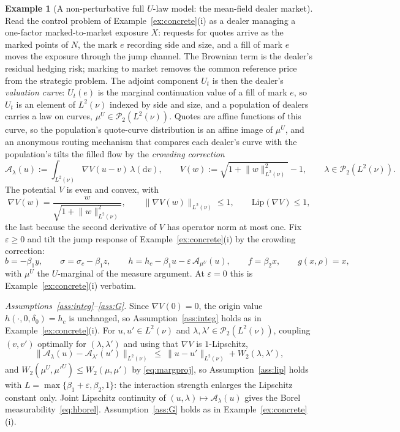 \documentclass[preprint,12pt]{elsarticle}
\newcommand{\diff}{\mathrm{d}}
\newcommand{\Lnu}{L^2(\nu)}
\newcommand{\Lnorm}[1]{\lVert #1\rVert_{\Lnu}}
\numberwithin{equation}{section}
\theoremstyle{plain}
\theoremstyle{definition}
\theoremstyle{\PaperRemarkStyle}
\newtheorem{example}[theorem]{Example}
\begin{document}
\begin{example}[A non-perturbative full $U$-law model: the mean-field dealer market]\label{ex:dealer}
Read the control problem of Example~\ref{ex:concrete}(i) as a dealer managing a one-factor
marked-to-market exposure $X$: requests for quotes arrive as the marked points of $N$, the
mark $e$ recording side and size, and a fill of mark $e$ moves the exposure through the
jump channel. The Brownian term is the dealer's residual hedging risk; marking to market
removes the common reference price from the strategic problem. The adjoint component $U_t$ is then the dealer's \emph{valuation curve}:
$U_t(e)$ is the marginal continuation value of a fill of mark $e$, so $U_t$ is an element
of $\Lnu$ indexed by side and size, and a population of dealers carries a law on curves,
$\mu^U\in\mathcal P_2(\Lnu)$. Quotes are affine functions of this curve, so the
population's quote-curve distribution is an affine image of $\mu^U$, and an anonymous
routing mechanism that compares each dealer's curve with the population's tilts the filled
flow by the \emph{crowding correction}
\[
\mathcal A_\lambda(u):=\int_{\Lnu}\nabla V(u-v)\,\lambda(\diff v),\qquad
V(w):=\sqrt{1+\Lnorm{w}^2}-1,\qquad \lambda\in\mathcal P_2(\Lnu).
\]
The potential $V$ is even and convex, with
\[
\nabla V(w)=\frac{w}{\sqrt{1+\Lnorm{w}^2}},\qquad \Lnorm{\nabla V(w)}\le1,\qquad
\mathrm{Lip}(\nabla V)\le1,
\]
the last because the second derivative of $V$ has operator norm at most one.
Fix $\varepsilon\ge0$ and tilt the jump response of Example~\ref{ex:concrete}(i) by the
crowding correction:
\[
b=-\beta_1 y,\qquad \sigma=\sigma_c-\beta_1 z,\qquad
h=h_c-\beta_1 u-\varepsilon\,\mathcal A_{\mu^U}(u),\qquad
f=\beta_2 x,\qquad g(x,\rho)=x ,
\]
with $\mu^U$ the $U$-marginal of the measure argument. At $\varepsilon=0$ this is
Example~\ref{ex:concrete}(i) verbatim.

\smallskip
\emph{Assumptions~\ref{ass:integ}--\ref{ass:G}.} Since $\nabla V(0)=0$, the origin value
$h(\cdot,0,\delta_0)=h_c$ is unchanged, so Assumption~\ref{ass:integ} holds as in
Example~\ref{ex:concrete}(i). For $u,u'\in\Lnu$ and
$\lambda,\lambda'\in\mathcal P_2(\Lnu)$, coupling $(v,v')$ optimally for
$(\lambda,\lambda')$ and using that $\nabla V$ is $1$-Lipschitz,
\[
\Lnorm{\mathcal A_\lambda(u)-\mathcal A_{\lambda'}(u')}
\ \le\ \Lnorm{u-u'}+W_2(\lambda,\lambda') ,
\]
and $W_2(\mu^U,\mu'^U)\le W_2(\mu,\mu')$ by \eqref{eq:margproj}, so
Assumption~\ref{ass:lip} holds with $L=\max\{\beta_1+\varepsilon,\beta_2,1\}$: the
interaction strength enlarges the Lipschitz constant only. Joint Lipschitz continuity of
$(u,\lambda)\mapsto\mathcal A_\lambda(u)$ gives the Borel
measurability~\eqref{eq:hborel}. Assumption~\ref{ass:G} holds as in
Example~\ref{ex:concrete}(i).


\end{example}
\end{document}
